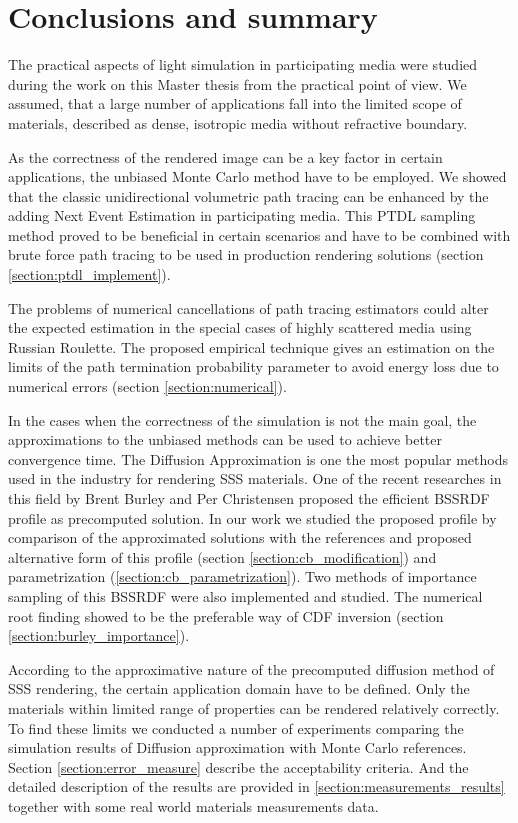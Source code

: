 \chapter{Conclusions and summary}
The practical aspects of light simulation in participating media were studied during the work on
this Master thesis from the practical point of view. We assumed, that a large number of applications
fall into the limited scope of materials, described as dense, isotropic media without refractive
boundary.

As the correctness of the rendered image can be a key factor in certain applications, the unbiased
Monte Carlo method have to be employed. We showed that the classic unidirectional volumetric path
tracing can be enhanced by the adding Next Event Estimation in participating media. This PTDL
sampling method proved to be beneficial in certain scenarios and have to be combined with brute
force path tracing to be used in production rendering solutions (section
\ref{section:ptdl_implement}).

The problems of numerical cancellations of path tracing estimators could alter the expected
estimation in the special cases of highly scattered media using Russian Roulette.
The proposed empirical technique gives an estimation on the limits of the path termination
probability parameter to avoid energy loss due to numerical errors (section
\ref{section:numerical}).

In the cases when the correctness of the simulation is not the main goal, the approximations to the
unbiased methods can be used to achieve better convergence time. The Diffusion Approximation is one
the most popular methods used in the industry for rendering SSS materials. One of the recent
researches in this field by Brent Burley and Per Christensen proposed the efficient BSSRDF profile
as precomputed solution. In our work we studied the proposed profile by comparison of the
approximated solutions with the references and proposed alternative form of this profile (section
\ref{section:cb_modification}) and parametrization (\ref{section:cb_parametrization}). Two methods
of importance sampling of this BSSRDF were also implemented and studied. The numerical root finding
showed to be the preferable way of CDF inversion (section \ref{section:burley_importance}).

According to the approximative nature of the precomputed diffusion method of SSS rendering, the
certain application domain have to be defined. Only the materials within limited range of properties
can be rendered relatively correctly. To find these limits we conducted a number of experiments
comparing the simulation results of Diffusion approximation with Monte Carlo references. Section
\ref{section:error_measure} describe the acceptability criteria. And the detailed description of the
results are provided in \ref{section:measurements_results} together with some real world materials
measurements data.

